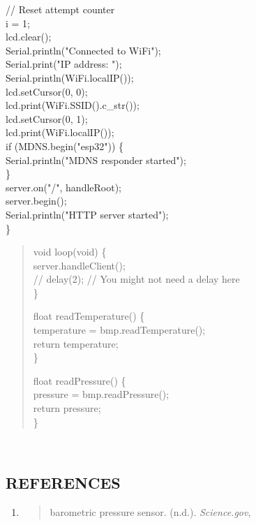 \documentclass[
]{article}
\begin{document}
// Reset attempt counter\\
i = 1;\\
lcd.clear();\\
Serial.println("Connected to WiFi");\\
Serial.print("IP address: ");\\
Serial.println(WiFi.localIP());\\
lcd.setCursor(0, 0);\\
lcd.print(WiFi.SSID().c\_str());\\
lcd.setCursor(0, 1);\\
lcd.print(WiFi.localIP());\\
if (MDNS.begin("esp32")) \{\\
Serial.println("MDNS responder started");\\
\}\\
server.on("/", handleRoot);\\
server.begin();\\
Serial.println("HTTP server started");\\
\}


\begin{minipage}[b]{\linewidth}\raggedright
\begin{quote}
void loop(void) \{\\
server.handleClient();\\
// delay(2); // You might not need a delay here\\
\}

float readTemperature() \{\\
temperature = bmp.readTemperature();\\
return temperature;\\
\}

float readPressure() \{\\
pressure = bmp.readPressure();\\
return pressure;\\
\}
\end{quote}\strut
\end{minipage} \\


\newpage
\hypertarget{references}{%
\subsection{REFERENCES}\label{references}}

\begin{enumerate}
\def\labelenumi{\arabic{enumi}.}
\item
  \begin{quote}
  barometric pressure sensor. (n.d.). \emph{Science.gov},
  \end{quote}
\end{enumerate}
\end{document}
